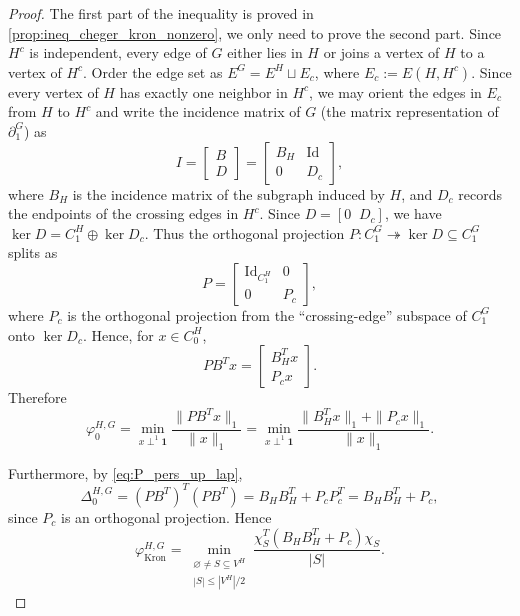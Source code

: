 \documentclass{article}
\newcommand{\id}{\mathrm{Id}}
\newcommand{\one}{\mathbf{1}}
\begin{document}
\begin{proof}
The first part of the inequality is proved in \cref{prop:ineq_cheger_kron_nonzero},
we only need to prove the second part.
Since \(H^c\) is independent, every edge of \(G\) either lies in \(H\) or joins a vertex of \(H\) to a vertex of \(H^c\). Order the edge set as \(E^G=E^H\sqcup E_c\), where \(E_c:=E(H,H^c)\). Since every vertex of \(H\) has exactly one neighbor in \(H^c\), we may orient the edges in \(E_c\) from \(H\) to \(H^c\) and write the incidence matrix of $G$ (the matrix representation of $\partial_1^G$) as
\[
I=\begin{bmatrix}B\\D\end{bmatrix}=\begin{bmatrix}B_H&\id\\0&D_c\end{bmatrix},
\]
where \(B_H\) is the incidence matrix of the subgraph induced by \(H\), and \(D_c\) records the endpoints of the crossing edges in \(H^c\). Since \(D=[0\;\;D_c]\), we have \(\ker D=C_1^H\oplus\ker D_c\). Thus the orthogonal projection \(P:C_1^G\twoheadrightarrow\ker D \subseteq C_1^G\) splits as
\[
P=\begin{bmatrix}\id_{C_1^H}&0\\0&P_c\end{bmatrix},
\]
where \(P_c\) is the orthogonal projection from the ``crossing-edge'' subspace of $C_1^G$ onto \(\ker D_c\).  Hence, for \(x\in C_0^H\),
\[
PB^Tx=\begin{bmatrix}B_H^Tx\\P_cx\end{bmatrix}.
\]
Therefore
\[
\varphi_0^{H,G}=\min_{x\perp^1\one}\frac{\|PB^Tx\|_1}{\|x\|_1}=\min_{x\perp^1\one}\frac{\|B_H^Tx\|_1+\|P_cx\|_1}{\|x\|_1}.
\]

Furthermore, by \cref{eq:P_pers_up_lap},
\[
\Delta_0^{H,G}=(PB^T)^T(PB^T)=B_HB_H^T+P_cP_c^T=B_HB_H^T+P_c,
\]
since \(P_c\) is an orthogonal projection. Hence
\[
\varphi_{\operatorname{Kron}}^{H,G}
=
\min_{\substack{\varnothing\neq S\subseteq V^H\\ |S|\leq |V^H|/2}}
\frac{\chi_S^T(B_HB_H^T+P_c)\chi_S}{|S|}.
\]


\end{proof}
\end{document}
